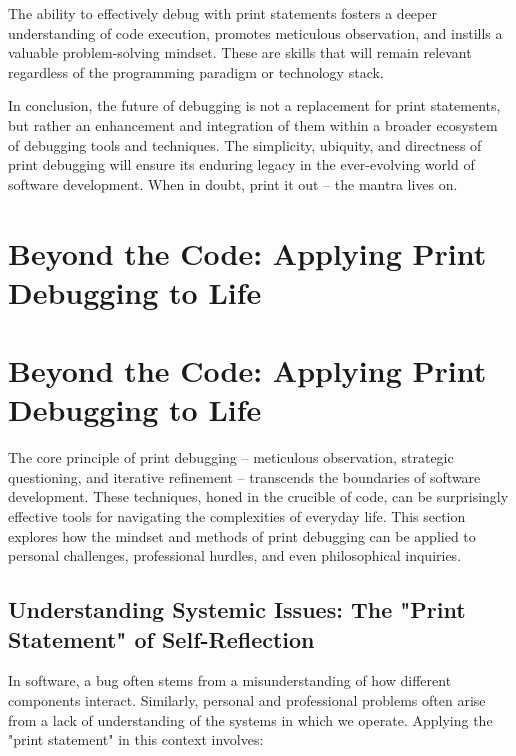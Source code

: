 \documentclass{article}
\begin{document}
{{{{The ability to effectively debug with print statements fosters a deeper understanding of code execution, promotes meticulous observation, and instills a valuable problem-solving mindset. These are skills that will remain relevant regardless of the programming paradigm or technology stack.

In conclusion, the future of debugging is not a replacement for print statements, but rather an enhancement and integration of them within a broader ecosystem of debugging tools and techniques. The simplicity, ubiquity, and directness of print debugging will ensure its enduring legacy in the ever-evolving world of software development. When in doubt, print it out – the mantra lives on.

\newpage

\section*{Beyond the Code: Applying Print Debugging to Life} %
\label{chapter-10-4-Beyond_the_Code__Applying_Print_Debuggin}

\section*{Beyond the Code: Applying Print Debugging to Life}

The core principle of print debugging – meticulous observation, strategic questioning, and iterative refinement – transcends the boundaries of software development. These techniques, honed in the crucible of code, can be surprisingly effective tools for navigating the complexities of everyday life. This section explores how the mindset and methods of print debugging can be applied to personal challenges, professional hurdles, and even philosophical inquiries.

\subsection*{Understanding Systemic Issues: The "Print Statement" of Self-Reflection}

In software, a bug often stems from a misunderstanding of how different components interact. Similarly, personal and professional problems often arise from a lack of understanding of the systems in which we operate. Applying the "print statement" in this context involves:

}}}}
\end{document}
